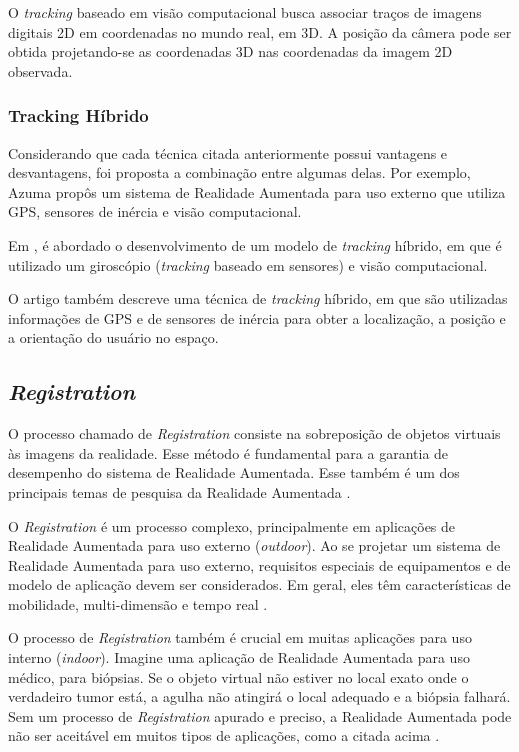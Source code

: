 O \textit{tracking} baseado em visão computacional busca associar traços de imagens 
digitais 2D em coordenadas no mundo real, em 3D.
A posição da câmera pode ser obtida projetando-se as coordenadas 3D nas coordenadas
da imagem 2D observada.    



\subsubsection{Tracking Híbrido}

Considerando que cada técnica citada anteriormente possui vantagens e desvantagens, 
foi proposta a combinação entre algumas delas. Por exemplo, Azuma\cite{SurveyAR}
propôs um sistema de Realidade Aumentada para uso externo que utiliza \gls{GPS}, 
sensores de inércia e visão computacional.

Em \cite{HybridTrackingOutdoorAR}, é abordado o desenvolvimento de um modelo de \textit{tracking}
híbrido, em que é utilizado um giroscópio (\textit{tracking} baseado em sensores)
e visão computacional.

O artigo \cite{HybridTrackingForGIS} também descreve uma técnica de \textit{tracking} híbrido,
em que são utilizadas informações de \gls{GPS} e de sensores de inércia para obter a localização,
a posição e a orientação do usuário no espaço.







\subsection{\textit{Registration}}

O processo chamado de \textit{Registration} consiste na sobreposição de objetos
virtuais às imagens da realidade. Esse método é fundamental para a garantia
de desempenho do sistema de Realidade Aumentada. Esse também é um dos principais
temas de pesquisa da Realidade Aumentada \cite{DevActuallyRegistration}.

O \textit{Registration} é um processo complexo, principalmente em aplicações de
Realidade Aumentada para uso externo (\textit{outdoor}). Ao se projetar um
sistema de Realidade Aumentada para uso externo, requisitos especiais de
equipamentos e de modelo de aplicação devem ser considerados. Em geral, eles
têm características de mobilidade, multi-dimensão e tempo real \cite{DevActuallyRegistration}.


O processo de \textit{Registration} também é crucial em muitas aplicações para uso interno
(\textit{indoor}). Imagine uma aplicação de Realidade Aumentada para uso médico, para biópsias.
Se o objeto virtual não estiver no local exato onde o verdadeiro tumor está, a agulha não atingirá
o local adequado e a biópsia falhará. Sem um processo de \textit{Registration} apurado e preciso, 
a Realidade Aumentada pode não ser aceitável em muitos tipos de aplicações, como a citada acima 
\cite{SurveyAR}.






